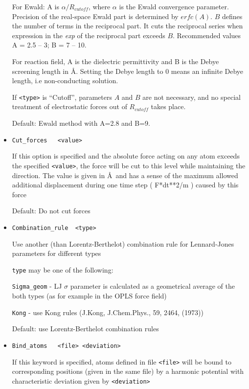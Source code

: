 \documentclass{article}
\begin{document}
\begin{itemize}
For Ewald: A is $\alpha /R_{cutoff}$, where $\alpha$ is the Ewald convergence 
parameter. Precision of the real-space Ewald part is determined by $erfc(A)$.
$B$ defines the number of terms in the reciprocal part. It cuts the reciprocal 
series when expression in the {\it exp} of the reciprocal part exceeds $B$.
Recommended values A = 2.5 -- 3;  B = 7 -- 10.

For reaction field, A is the dielectric permittivity and B is the Debye
screening length in \AA . Setting the Debye length to 0 means an infinite 
Debye length, i.e non-conducting solution.

If \verb|<type>| is ``Cutoff'', parameters $A$ and $B$ are not necessary, and
no special treatment of electrostatic forces out of $R_{cutoff}$ takes place.

Default:  Ewald method with A=2.8 and B=9.

\item
\verb|Cut_forces   <value>|

If this option is specified and the absolute force acting on any atom 
exceeds the specified \verb|<value>|, the force will be cut to this level while
maintaining the direction. The value is given in \AA ~and has a sense
of the maximum allowed additional displacement during one time step 
( F*dt**2/m ) caused by this force

Default: Do not cut forces

\item
\verb|Combination_rule  <type>|

Use another (than Lorentz-Berthelot) combination rule for Lennard-Jones
parameters for different types

\verb|type| may be one of the following:

\verb|Sigma_geom| - LJ $\sigma$ parameter is calculated as a geometrical 
average of the both types (as for example in the OPLS force field)
 
\verb|Kong| - use Kong rules (J.Kong, J.Chem.Phys., 59, 2464, (1973))

Default: use Lorentz-Berthelot combination rules

\item
\verb|Bind_atoms   <file> <deviation>|

If this keyword is specified, atoms defined in file \verb|<file>| will be
bound to corresponding positions (given in the same file) by a
harmonic potential with characteristic deviation given by \verb|<deviation>|

\end{itemize}
\end{document}
